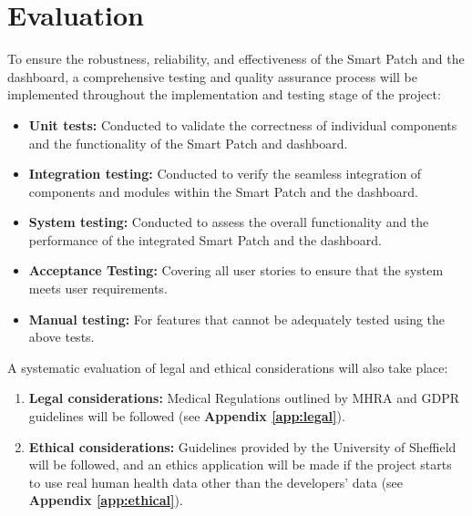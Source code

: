 \section{Evaluation}
To ensure the robustness, reliability, and effectiveness of the Smart Patch and the dashboard, a comprehensive testing and quality assurance process will be implemented throughout the implementation and testing stage of the project:
\begin{itemize}
    \item \textbf{Unit tests:} Conducted to validate the correctness of individual components and the functionality of the Smart Patch and dashboard.
    \item \textbf{Integration testing:} Conducted to verify the seamless integration of components and modules within the Smart Patch and the dashboard.
    \item \textbf{System testing:} Conducted to assess the overall functionality and the performance of the integrated Smart Patch and the dashboard.
    \item \textbf{Acceptance Testing:} Covering all user stories to ensure that the system meets user requirements.
    \item \textbf{Manual testing:} For features that cannot be adequately tested using the above tests.
\end{itemize} 
A systematic evaluation of legal and ethical considerations will also take place:
\begin{enumerate}
    \item \textbf{Legal considerations:} Medical Regulations outlined by MHRA and GDPR guidelines will be followed (see \textbf{Appendix \ref{app:legal}}).
    \item \textbf{Ethical considerations:} Guidelines provided by the University of Sheffield will be followed, and an ethics application will be made if the project starts to use real human health data other than the developers' data (see \textbf{Appendix \ref{app:ethical}}).
\end{enumerate}


